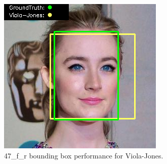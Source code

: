\documentclass{l4proj}
\begin{document}
\begin{appendices}
\begin{figure}[h!]
\begin{minipage}{0.49\textwidth}
     \includegraphics[width=\textwidth]{images/appendix/viola/47.png}
    \caption{47\_f\_r bounding box performance for Viola-Jones.}
    \label{whoopi_result}
  \end{minipage}
\end{figure}
\clearpage

\end{appendices}
\end{document}
